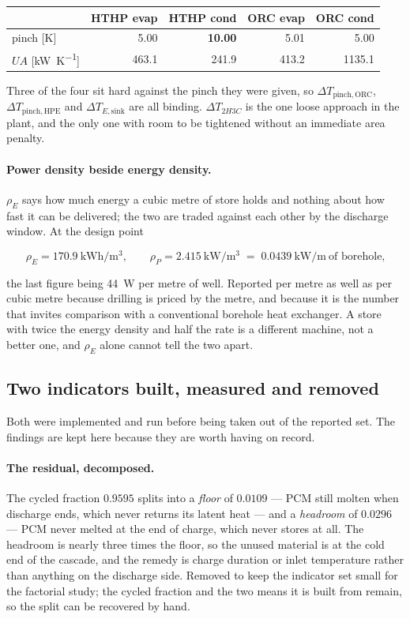 \begin{center}
\begin{tabular}{@{}lrrrr@{}}
\toprule
 & HTHP evap & HTHP cond & ORC evap & ORC cond \\
\midrule
pinch [\si{\kelvin}] & 5.00 & \textbf{10.00} & 5.01 & 5.00 \\
$UA$ [\si{\kilo\watt\per\kelvin}] & 463.1 & 241.9 & 413.2 & 1135.1 \\
\bottomrule
\end{tabular}
\end{center}

Three of the four sit hard against the pinch they were given, so
$\Delta T_{\mathrm{pinch,ORC}}$, $\Delta T_{\mathrm{pinch,HPE}}$ and
$\Delta T_{E,\mathrm{sink}}$ are all binding. $\Delta T_{2H3C}$ is the one
loose approach in the plant, and the only one with room to be tightened
without an immediate area penalty.

\paragraph{Power density beside energy density.} $\rho_E$ says how much
energy a cubic metre of store holds and nothing about how fast it can be
delivered; the two are traded against each other by the discharge window. At
the design point

\[
  \rho_E = \SI{170.9}{\kilo\watt\hour\per\meter\cubed},
  \qquad
  \rho_P = \SI{2.415}{\kilo\watt\per\meter\cubed}
  \;=\; \SI{0.0439}{\kilo\watt\per\meter}\ \text{of borehole,}
\]

the last figure being \SI{44}{\watt} per metre of well. Reported per metre as
well as per cubic metre because drilling is priced by the metre, and because
it is the number that invites comparison with a conventional borehole heat
exchanger. A store with twice the energy density and half the rate is a
different machine, not a better one, and $\rho_E$ alone cannot tell the two
apart.

\subsection{Two indicators built, measured and removed}
\label{sec:exergy:removed}

Both were implemented and run before being taken out of the reported set. The
findings are kept here because they are worth having on record.

\paragraph{The residual, decomposed.} The cycled fraction $0.9595$ splits into
a \emph{floor} of $0.0109$ --- PCM still molten when discharge ends, which
never returns its latent heat --- and a \emph{headroom} of $0.0296$ --- PCM
never melted at the end of charge, which never stores at all. The headroom is
nearly three times the floor, so the unused material is at the cold end of
the cascade, and the remedy is charge duration or inlet temperature rather
than anything on the discharge side. Removed to keep the indicator set small
for the factorial study; the cycled fraction and the two means it is built
from remain, so the split can be recovered by hand.

